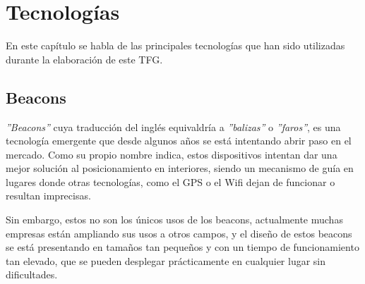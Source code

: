 %
%
%

\cleardoublepage
\chapter{Tecnologías} \label{chap:polytopes} %

En este capítulo se habla de las principales tecnologías que han sido utilizadas durante la elaboración de este TFG.

\section{Beacons}

\textit{''Beacons''} \cite{URL::Beacons} cuya traducción del inglés equivaldría a \textit{''balizas''} o \textit{''faros''}, es una tecnología emergente que desde algunos años se está intentando abrir paso en el mercado. Como su propio nombre indica, estos dispositivos intentan dar una mejor solución al posicionamiento en interiores, siendo un mecanismo de guía en lugares donde otras tecnologías, como el GPS o el Wifi dejan de funcionar o resultan imprecisas. 


Sin embargo, estos no son los únicos usos de los beacons, actualmente muchas empresas están ampliando sus usos a otros campos, y el diseño de estos beacons se está presentando en tamaños tan pequeños y con un tiempo de funcionamiento tan elevado, que se pueden desplegar prácticamente en cualquier lugar sin dificultades.




